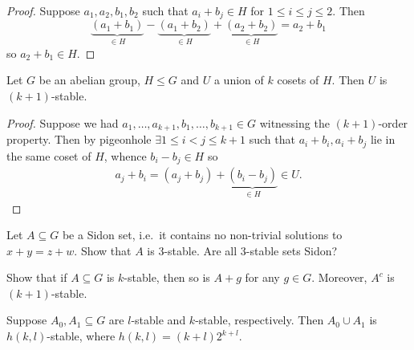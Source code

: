 \documentclass{article}
\begin{document}
\begin{proof}
  Suppose $a_1, a_2, b_1, b_2$ such that $a_i + b_j \in H$ for $1 \leq i \leq j \leq 2$. Then
  \begin{equation*}
    \underbrace{(a_1 + b_1)}_{\in H} - \underbrace{(a_1 + b_2)}_{\in H} + \underbrace{(a_2 + b_2)}_{\in H} = a_2 + b_1
  \end{equation*}
  so $a_2 + b_1 \in H$.
\end{proof}
\begin{lemma}
  Let $G$ be an abelian group, $H \leq G$ and $U$ a union of $k$ cosets of $H$.  Then $U$ is $(k+1)$-stable.
\end{lemma}
\begin{proof}
  Suppose we had $a_1, \dotsc, a_{k+1}, b_1, \dotsc, b_{k+1} \in G$ witnessing the $(k+1)$-order property.
  Then by pigeonhole $\exists 1 \leq i < j \leq k+1$ such that $a_i + b_i, a_i + b_j$ lie in the same coset of $H$, whence
  $b_i - b_j \in H$ so
  \begin{align*}
    a_j + b_i = (a_j + b_j) + \underbrace{(b_i - b_j)}_{\in H} \in U.
  \end{align*}
\end{proof}
\begin{ex}
  Let $A \subseteq G$ be a Sidon set, i.e.\ it contains no non-trivial solutions to $x+y = z+w$. Show that $A$ is 3-stable.
  Are all 3-stable sets Sidon?
\end{ex}
\begin{ex}
  Show that if $A \subseteq G$ is $k$-stable, then so is $A+g$ for any $g \in G$. Moreover, $A^c$ is $(k+1)$-stable.
\end{ex}
\begin{lemma}
  Suppose $A_0, A_1 \subseteq G$ are $l$-stable and $k$-stable, respectively.
  Then $A_0 \cup A_1$ is $h(k,l)$-stable, where $h(k,l) = (k+l)2^{k+l}$.
\end{lemma}
\end{document}
